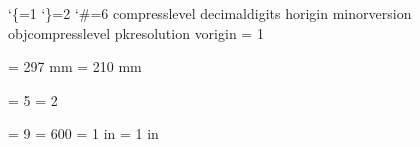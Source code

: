 

\begingroup
  \catcode`\{=1 %
  \catcode`\}=2 %
  \catcode`\#=6 %
  \def\list{%
      {compresslevel}%
      {decimaldigits}%
      {horigin}%
      {minorversion}%
      {objcompresslevel}%
      {pkresolution}%
      {vorigin}%
  }%
  \let\pdfoutput\outputmode
  \let\pdfpageheight\pageheight
  \let\pdfpagewidth\pagewidth
  \def\do#1{%
    \ifx\relax#1\else
      \expandafter\edef\csname pdf#1\endcsname{\pdfvariable #1}%
      \expandafter\do
    \fi
  }%
  \expandafter\do\list\relax
  \pdfoutput           = 1

  \pdfpageheight       = 297 mm
  \pdfpagewidth        = 210 mm

  \pdfminorversion     = 5
  \pdfobjcompresslevel = 2

  \pdfcompresslevel    = 9
  \pdfpkresolution     = 600
  \pdfhorigin          = 1 in
  \pdfvorigin          = 1 in
  \ifx\dvimode\relax
    \pdfoutput=0 %
  \fi
  \let\dvimode\undefined
\endgroup
